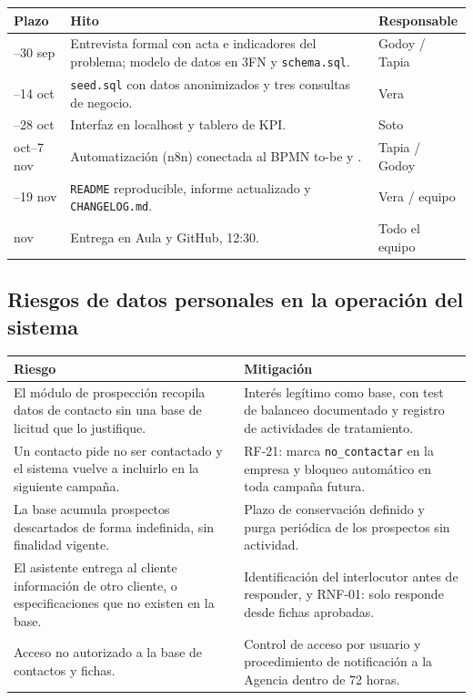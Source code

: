 \documentclass{article}
\begin{document}
\begin{table}[H]
\centering
\small
\renewcommand{\arraystretch}{1.2}
\begin{tabularx}{\textwidth}{@{}>{\raggedright\arraybackslash}p{}L>{\raggedright\arraybackslash}p{0.20\textwidth}@{}}
\toprule
\textbf{Plazo} & \textbf{Hito} & \textbf{Responsable} \\
--30 sep & Entrevista formal con acta e indicadores del problema; modelo de datos en 3FN y \texttt{schema.sql}. & Godoy / Tapia \\
--14 oct & \texttt{seed.sql} con datos anonimizados y tres consultas de negocio. & Vera \\
--28 oct & Interfaz en localhost y tablero de KPI. & Soto \\
 oct--7 nov & Automatización (n8n) conectada al BPMN to-be y . & Tapia / Godoy \\
--19 nov & \texttt{README} reproducible, informe actualizado y \texttt{CHANGELOG.md}. & Vera / equipo \\
 nov & Entrega en Aula y GitHub, 12:30. & Todo el equipo \\
\bottomrule
\end{tabularx}
\end{table}

\subsection{Riesgos de datos personales en la operación del sistema}

\begin{table}[H]
\centering
\small
\renewcommand{\arraystretch}{1.2}
\begin{tabularx}{\textwidth}{@{}LL@{}}
\toprule
\textbf{Riesgo} & \textbf{Mitigación} \\
\midrule
El módulo de prospección recopila datos de contacto sin una base de licitud que lo justifique. & Interés legítimo como base, con test de balanceo documentado y registro de actividades de tratamiento. \\
\addlinespace
Un contacto pide no ser contactado y el sistema vuelve a incluirlo en la siguiente campaña. & RF-21: marca \texttt{no\_contactar} en la empresa y bloqueo automático en toda campaña futura. \\
\addlinespace
La base acumula prospectos descartados de forma indefinida, sin finalidad vigente. & Plazo de conservación definido y purga periódica de los prospectos sin actividad. \\
\addlinespace
El asistente entrega al cliente información de otro cliente, o especificaciones que no existen en la base. & Identificación del interlocutor antes de responder, y RNF-01: solo responde desde fichas aprobadas. \\
\addlinespace
Acceso no autorizado a la base de contactos y fichas. & Control de acceso por usuario y procedimiento de notificación a la Agencia dentro de 72 horas. \\
\bottomrule
\end{tabularx}
\end{table}
\end{document}

